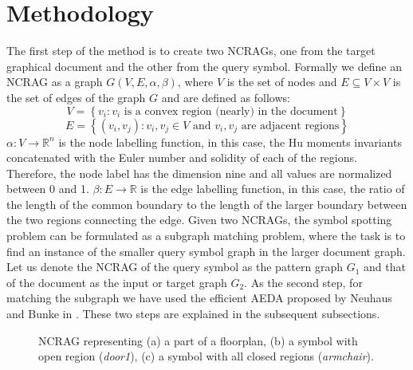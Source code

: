 \section{Methodology}
\label{sec:ncrag:method}
The first step of the method is to create two NCRAGs, one from the target graphical document and the other from the query symbol. Formally we define an NCRAG as a graph $G(V,E,\alpha,\beta)$, where $V$ is the set of nodes and $E\subseteq V\times V$ is the set of edges of the graph $G$ and are defined as follows:
\begin{equation*}
V=\left\{v_i:v_i\mbox{ is a convex region (nearly) in the document}\right\}
\end{equation*}
\begin{equation*}
E=\left\{(v_i,v_j):v_i,v_j \in V\mbox{ and }v_i,v_j\mbox{ are adjacent regions}\right\}
\end{equation*}
$\alpha:V\rightarrow\mathbb{R}^n$ is the node labelling function, in this case, the Hu moments invariants concatenated with the Euler number and solidity of each of the regions. Therefore, the node label has the dimension nine and all values are normalized between 0 and 1. $\beta:E\rightarrow\mathbb{R}$ is the edge labelling function, in this case, the ratio of the length of the common boundary to the length of the larger boundary between the two regions connecting the edge. Given two NCRAGs, the symbol spotting problem can be formulated as a subgraph matching problem, where the task is to find an instance of the smaller query symbol graph in the larger document graph. Let us denote the NCRAG of the query symbol as the pattern graph $G_1$ and that of the document as the input or target graph $G_2$. As the second step, for matching the subgraph we have used the efficient AEDA proposed by Neuhaus and Bunke in \cite{Neuhaus2004}. These two steps are explained in the subsequent subsections.
\begin{figure}[!h]
\centering
{}
\hspace{0.2cm}
\hspace{0.2cm}
\caption{NCRAG representing (a) a part of a floorplan, (b) a symbol with open region (\textit{door1}), (c) a symbol with all closed regions (\textit{armchair}).}
\label{fig:ncrag:rag-fp-symb}
\end{figure}
